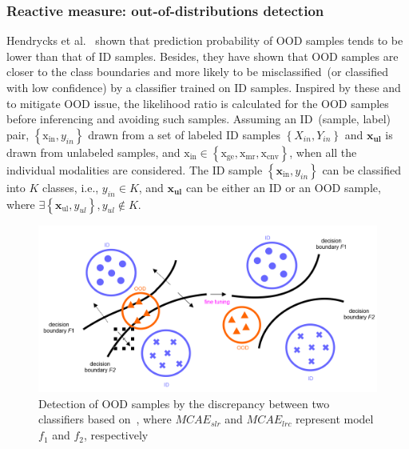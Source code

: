 \subsubsection{Reactive measure: out-of-distributions detection}
\noindent Hendrycks et al.~\cite{OOD18} shown that prediction probability of OOD samples tends to be lower than that of ID samples. Besides, they have shown that OOD samples are closer to the class boundaries and more likely to be misclassified~(or classified with low confidence) by a classifier trained on ID samples. Inspired by these and to mitigate OOD issue, the likelihood ratio is calculated for the OOD samples before inferencing and avoiding such samples.  
Assuming an ID~(sample, label) pair, $\left\{\mathrm{x}_{\text {in}}, y_{in}\right\}$ drawn from a set of labeled ID samples $\left\{X_{in}, Y_{in}\right\}$ and $\mathbf{x}_{\mathbf{ul}}$ is drawn from unlabeled samples, and $\mathrm{x}_\text{in} \in \left\{\mathrm{x}_{\text {ge}}, \mathrm{x}_{\text {mr}}, \mathrm{x}_{\text {cnv}}\right\}$, when all the individual modalities are considered. The ID sample $\left\{\mathbf{x}_{\text {in}}, y_{in}\right\}$ can be classified into $K$ classes, i.e., $y_{in} \in K$, and $\mathbf{x}_{\mathbf{ul}}$ can be either an ID or an OOD sample, where $\exists\left\{\mathbf{x}_{\text {ul}}, y_{ul}\right\}, y_{ul} \notin K$. 

\begin{figure}
    \centering
    \includegraphics[scale=0.6]{images/ood_ex_1.png}
    \caption[OOD sample detection w.r.t discrepancy between two different  classifiers]{Detection of OOD samples by the discrepancy between two classifiers based on~\cite{OOD19}, where $MCAE_{slr}$ and $MCAE_{lrc}$ represent model $f_1$ and $f_2$, respectively}
    \label{fig:ood_detection_example}
    \vspace{-4mm}
\end{figure}

